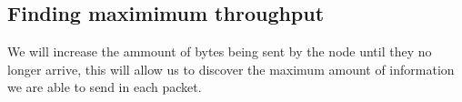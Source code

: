 	\subsection{Finding maximimum throughput}
		We will increase the ammount of bytes being sent by the node until they no longer arrive, this will allow us to discover the maximum amount of information we are able to send in each packet.








